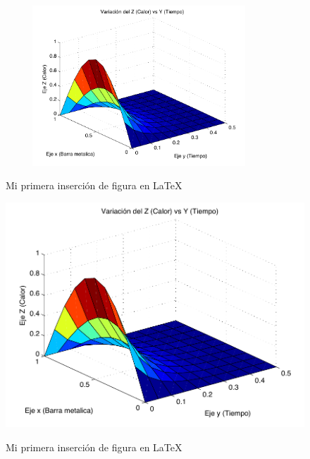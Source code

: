 \documentclass[a4paper, 11pt]{article}
\begin{document}
        \begin{figure}[ht]
            \centering
            \caption{Mi primera inserción de figura en \LaTeX}
            \includegraphics[width = 10cm, height = 6cm]{04_ENTORNOS_FLOTANTES/images/Grafica3D.pdf}
            \label{fig: Grafica 3D - 1}
        \end{figure}
        
        \begin{figure}[ht]
            \centering
            \caption{Mi primera inserción de figura en \LaTeX}
            \includegraphics[width = \linewidth]{04_ENTORNOS_FLOTANTES/images/Grafica3D.pdf}
            \label{fig: Grafica3D - 2}
        \end{figure}
\end{document}
